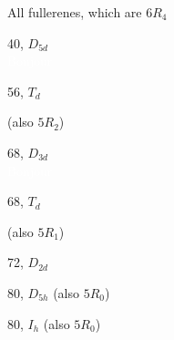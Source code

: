 \documentclass[%
pdf,
colorBG,
slideColor,
]{prosper}
\begin{document}
\begin{slide}{All fullerenes, which are $6R_4$}
\begin{center}
\begin{minipage}[b]{2.7cm}
\centering
{}\par
40, $D_{5d}$\\
\textcolor{white}{Bonjour}
\end{minipage}
\begin{minipage}[b]{2.7cm}
\centering
{}\par
56, $T_d$\par
(also $5R_2$)
\end{minipage}
\begin{minipage}[b]{2.7cm}
\centering
{}\par
68, $D_{3d}$\\
\textcolor{white}{Bonjour}
\end{minipage}
\begin{minipage}[b]{2.7cm}
\centering
{}\par
68, $T_d$\par
(also $5R_1$)
\end{minipage}
\begin{minipage}[b]{3.3cm}
\centering
{}\par
72, $D_{2d}$
\end{minipage}
\begin{minipage}[b]{3.5cm}
\centering
{}\par
80, $D_{5h}$ (also $5R_0$)
\end{minipage}
\begin{minipage}[b]{3.3cm}
\centering
{}\par
80, $I_h$ (also $5R_0$)
\end{minipage}
\end{center}
\end{slide}
\end{document}
